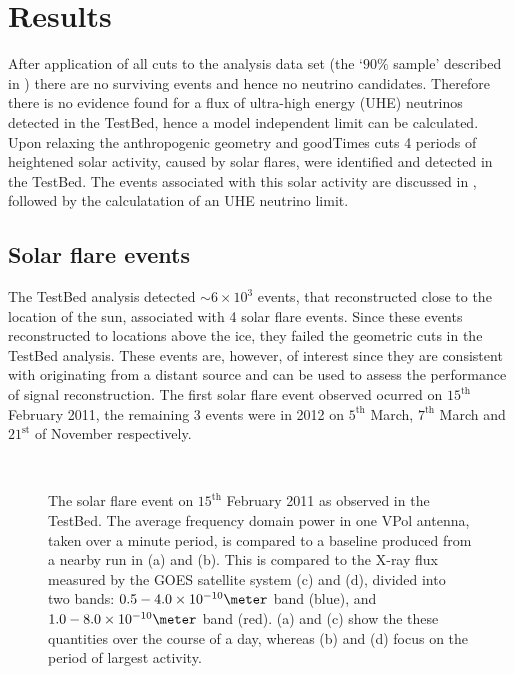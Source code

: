 \chapter{Results}
\label{chap:Results}

After application of all cuts to the analysis data set (the `$90 \%$ sample' described in ) there are no surviving events and hence no neutrino candidates. Therefore there is no evidence found for a flux of ultra-high energy (UHE) neutrinos detected in the TestBed, hence a model independent limit can be calculated. Upon relaxing the anthropogenic geometry and goodTimes cuts 4 periods of heightened solar activity, caused by solar flares, were identified and detected in the TestBed. The events associated with this solar activity are discussed in , followed by the calculatation of an UHE neutrino limit.


\section{Solar flare events}
\label{sec:Results:Solar-Flare}

The TestBed analysis detected $\sim 6 \times 10^{3}$ events, that reconstructed close to the location of the sun, associated with 4 solar flare events. Since these events reconstructed to locations above the ice, they failed the geometric cuts in the TestBed analysis. These events are, however, of interest since they are consistent with originating from a distant source and can be used to assess the performance of signal reconstruction. The first solar flare event observed ocurred on $15^{\mbox{th}}$ February 2011, the remaining 3 events were in 2012 on $5^{\mbox{th}}$ March, $7^{\mbox{th}}$ March and $21^{\mbox{st}}$ of November respectively.



\begin{figure} [htpb]
  \hfill
  \\
  \hfill
  \caption{The solar flare event on $15^{\mbox{th}}$ February 2011 as observed in the TestBed. The average frequency domain power in one VPol antenna, taken over a minute period, is compared to a baseline produced from a nearby run in (a) and (b). This is compared to the X-ray flux measured by the GOES satellite system \cite{2009SPIE.7438E...1C} (c) and (d), divided into two bands: $0.5 - 4.0 \times 10^{-10} \meter$ band (blue), and $1.0 - 8.0 \times 10^{-10} \meter$ band (red). (a) and (c) show the these quantities over the course of a day, whereas (b) and (d) focus on the period of largest activity.}  
  \label{fig:Results:Solar-Flare:Frequency}
\end{figure}

